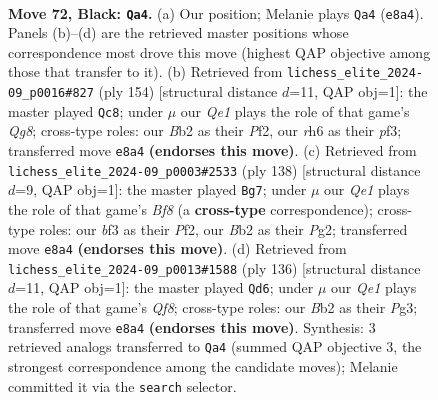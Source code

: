 \documentclass[11pt]{article}
\begin{document}
\clearpage

\begin{figure}[p]\centering
\begin{subfigure}{0.46\textwidth}\centering
\resizebox{\linewidth}{!}{%
\newchessgame
\chessboard[
  setfen={4q3/8/7R/8/8/1p1k1B2/1b6/5K2 b - - 1 72},
  showmover=false,
  pgfstyle=straightmove, color=movearrow, markmove={e8-a4}
]}
\caption{}
\end{subfigure}\hfill
\begin{subfigure}{0.46\textwidth}\centering
\resizebox{\linewidth}{!}{%
\newchessgame
\chessboard[
  setfen={6Q1/8/8/5K2/1k3B2/5p2/5P2/8 w - - 1 78},
  showmover=false,
  pgfstyle=straightmove, color=movearrow, markmove={g8-c8}
]}
\caption{}
\end{subfigure}
\\[4pt]
\begin{subfigure}{0.46\textwidth}\centering
\resizebox{\linewidth}{!}{%
\newchessgame
\chessboard[
  setfen={5B2/8/4k3/8/6K1/2p5/5PP1/r7 w - - 2 70},
  showmover=false,
  pgfstyle=straightmove, color=movearrow, markmove={f8-g7}
]}
\caption{}
\end{subfigure}\hfill
\begin{subfigure}{0.46\textwidth}\centering
\resizebox{\linewidth}{!}{%
\newchessgame
\chessboard[
  setfen={5Q2/8/8/6K1/2k1r3/6Pb/8/8 w - - 1 69},
  showmover=false,
  pgfstyle=straightmove, color=movearrow, markmove={f8-d6}
]}
\caption{}
\end{subfigure}
\caption{\textbf{Move 72, Black: \texttt{Qa4}.} (a) Our position; Melanie plays \texttt{Qa4} (\texttt{e8a4}). Panels (b)--(d) are the retrieved master positions whose correspondence most drove this move (highest QAP objective among those that transfer to it). (b) Retrieved from \texttt{lichess\_elite\_2024-09\_p0016\#827} (ply 154) [structural distance $d$=11, QAP obj=1]: the master played \texttt{Qc8}; under $\mu$ our \emph{Qe1} plays the role of that game's \emph{Qg8}; cross-type roles: our \emph{B}b2 as their \emph{P}f2, our \emph{r}h6 as their \emph{p}f3; transferred move \texttt{e8a4} \textbf{(endorses this move)}. (c) Retrieved from \texttt{lichess\_elite\_2024-09\_p0003\#2533} (ply 138) [structural distance $d$=9, QAP obj=1]: the master played \texttt{Bg7}; under $\mu$ our \emph{Qe1} plays the role of that game's \emph{Bf8} (a \textbf{cross-type} correspondence); cross-type roles: our \emph{b}f3 as their \emph{P}f2, our \emph{B}b2 as their \emph{P}g2; transferred move \texttt{e8a4} \textbf{(endorses this move)}. (d) Retrieved from \texttt{lichess\_elite\_2024-09\_p0013\#1588} (ply 136) [structural distance $d$=11, QAP obj=1]: the master played \texttt{Qd6}; under $\mu$ our \emph{Qe1} plays the role of that game's \emph{Qf8}; cross-type roles: our \emph{B}b2 as their \emph{P}g3; transferred move \texttt{e8a4} \textbf{(endorses this move)}. Synthesis: 3 retrieved analogs transferred to \texttt{Qa4} (summed QAP objective 3, the strongest correspondence among the candidate moves); Melanie committed it via the \texttt{search} selector.}
\label{fig:thought-m143}
\end{figure}
\end{document}
